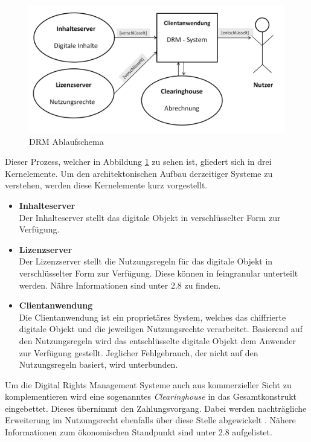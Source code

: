 \begin{spacing}{1.5}
\begin{figure}[ht]
\centering
\includegraphics[scale=0.7]{img/DRM_Architektur}
\caption{DRM Ablaufschema}
\label{fig:DRM_Schema}
\end{figure}

Dieser Prozess, welcher in Abbildung \ref{fig:DRM_Schema} zu sehen ist, gliedert sich in drei Kernelemente. Um den architektonischen Aufbau derzeitiger Systeme zu verstehen, werden diese Kernelemente kurz vorgestellt. 
\begin{itemize}
\item \textbf{Inhalteserver} \\
Der Inhalteserver stellt das digitale Objekt in verschlüsselter Form zur Verfügung. 
\item \textbf{Lizenzserver} \\
Der Lizenzserver stellt die Nutzungsregeln für das digitale Objekt in verschlüsselter Form zur Verfügung. Diese können in feingranular unterteilt werden. Nähre Informationen sind unter 2.8 zu finden.  


\item \textbf{Clientanwendung} \\
Die Clientanwendung ist ein proprietäres System, welches das chiffrierte digitale Objekt und die jeweiligen Nutzungsrechte verarbeitet. Basierend auf den Nutzungsregeln wird das entschlüsselte digitale Objekt dem Anwender zur Verfügung gestellt. Jeglicher Fehlgebrauch, der nicht auf den Nutzungsregeln basiert, wird unterbunden. 
\end{itemize}

Um die Digital Rights Management Systeme auch aus kommerzieller Sicht zu komplementieren wird eine sogenanntes \textit{Clearinghouse} in das Gesamtkonstrukt eingebettet. Dieses übernimmt den Zahlungsvorgang. Dabei werden nachträgliche Erweiterung im Nutzungsrecht ebenfalls über diese Stelle abgewickelt \cite[S.151]{Architektur}. Nähere Informationen zum ökonomischen Standpunkt sind unter 2.8 aufgelistet. \\


\end{spacing}
